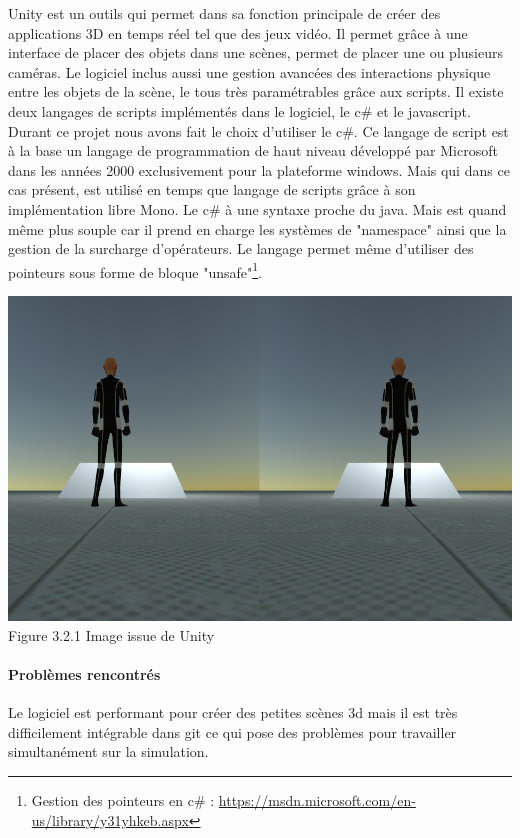 \documentclass[12pt,a4paper]{report}
\begin{document}
Unity est un outils qui permet dans sa fonction principale de créer des applications 3D en temps réel tel que des jeux vidéo. Il permet grâce à une interface de placer des objets dans une scènes, permet de placer une ou plusieurs caméras. Le logiciel inclus aussi une gestion avancées des interactions physique entre les objets de la scène, le tous très paramétrables grâce aux scripts. Il existe deux langages de scripts implémentés dans le logiciel, le c\# et le javascript. Durant ce projet nous avons fait le choix d'utiliser le c\#.
Ce langage de script est à la base un langage de programmation de haut niveau développé par Microsoft dans les années 2000 exclusivement pour la plateforme windows. Mais qui dans ce cas présent, est utilisé en temps que langage de scripts grâce à son implémentation libre Mono. Le c\# à une syntaxe proche du java. Mais est quand même plus souple car il prend en charge les systèmes de "namespace" ainsi que la gestion de la surcharge d'opérateurs. Le langage permet même d'utiliser des pointeurs sous forme de bloque "unsafe"\footnote{Gestion des pointeurs en c\# : \url{https://msdn.microsoft.com/en-us/library/y31yhkeb.aspx}}.

	\begin{center}
		\includegraphics[scale=0.5]{Screenshot_skybox.png}
		Figure 3.2.1 Image issue de Unity\\
	\end{center}
 	
\paragraph{Problèmes rencontrés}
Le logiciel est performant pour créer des petites scènes 3d mais il est très difficilement intégrable dans git ce qui pose des problèmes pour travailler simultanément sur la simulation.
\end{document}
